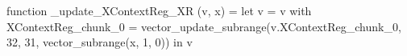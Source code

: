 function _update_XContextReg_XR (v, x) = let v = { v with XContextReg_chunk_0 = vector_update_subrange(v.XContextReg_chunk_0, 32, 31, vector_subrange(x, 1, 0)) } in v
